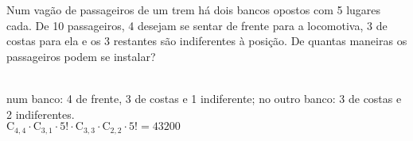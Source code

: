 \begin{ex}
Num vagão de passageiros de um trem há dois bancos opostos com 5 lugares cada. De 10 passageiros, 4 desejam se sentar de frente para a locomotiva, 3 de costas para ela e os 3 restantes são indiferentes à posição. De quantas maneiras os passageiros podem se instalar?
  \begin{sol}
   \phantom{A} \\
  num banco: 4 de frente, 3 de costas e 1 indiferente; 
  no outro banco: 3 de costas e 2 indiferentes. \\
  $\mathrm{C}_{4,4}\cdot\mathrm{C}_{3,1}\cdot5!\cdot\mathrm{C}_{3,3}\cdot\mathrm{C}_{2,2}\cdot5!=43200$
  \end{sol}
\end{ex}